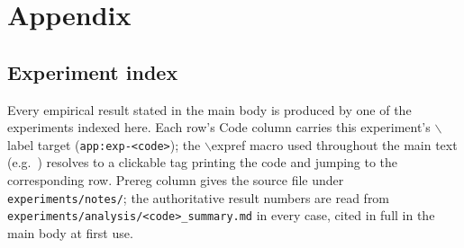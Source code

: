 \section{Appendix}

\subsection{Experiment index}
\label{app:expindex}

Every empirical result stated in the main body is produced by one of the experiments
indexed here. Each row's Code column carries this experiment's \(\backslash\)label
target (\texttt{app:exp-<code>}); the \(\backslash\)expref{} macro used throughout the
main text (e.g.\ ) resolves to a clickable tag printing the code and
jumping to the corresponding row. Prereg column gives the source file under
\texttt{experiments/notes/}; the authoritative result numbers are read from
\texttt{experiments/analysis/<code>\_summary.md} in every case, cited in full in the main
body at first use.

